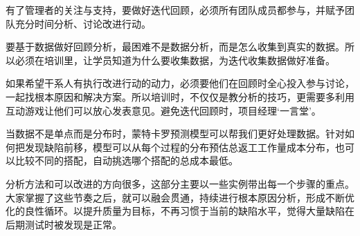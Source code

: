 


有了管理者的关注与支持，要做好迭代回顾，必须所有团队成员都参与，并赋予团队充分时间分析、讨论改进行动。

要基于数据做好回顾分析，最困难不是数据分析，而是怎么收集到真实的数据。所以必须在培训里，让学员知道为什么要收集数据，为迭代收集数据做好准备。

如果希望干系人有执行改进行动的动力，必须要他们在回顾时全心投入参与讨论，一起找根本原因和解决方案。所以培训时，不仅仅是教分析的技巧，更需要多利用互动游戏让他们可以放心发表意见。避免迭代回顾时，项目经理`一言堂'。

当数据不是单点而是分布时，蒙特卡罗预测模型可以帮我们更好处理数据。针对如何把发现缺陷前移，模型可以从每个过程的分布预估总返工工作量成本分布，也可以比较不同的搭配，自动挑选哪个搭配的总成本最低。

分析方法和可以改进的方向很多，这部分主要以一些实例带出每一个步骤的重点。大家掌握了这些节奏之后，就可以融会贯通，持续进行根本原因分析，形成不断优化的良性循环。以提升质量为目标，不再习惯于当前的缺陷水平，觉得大量缺陷在后期测试时被发现是正常。


